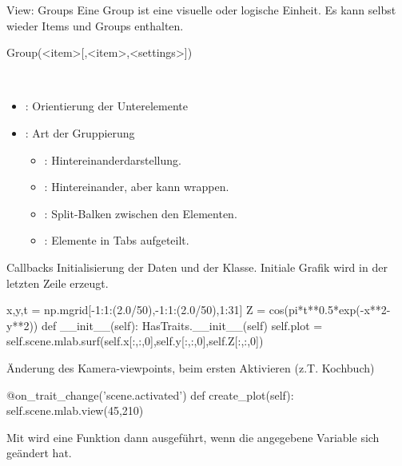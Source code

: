 \documentclass[hyperref={xetex}]{beamer}
\begin{document}
\begin{frame}[fragile]{View: Groups}
  Eine Group ist eine visuelle oder logische Einheit. Es kann selbst wieder Items und Groups enthalten.
  \begin{pyin}
Group(<item>[,<item>,<settings>])    
  \end{pyin}
\\
\begin{itemize}
  \item {}: Orientierung der Unterelemente\\
  \item {}:  Art der Gruppierung
\begin{itemize}
  \item {}: Hintereinanderdarstellung.\\
  \item {}: Hintereinander, aber kann wrappen.\\
  \item {}: Split-Balken zwischen den Elementen.\\
  \item {}: Elemente in Tabs aufgeteilt.
\end{itemize}
\end{itemize}
\end{frame}

\begin{frame}[fragile]{Callbacks}
Initialisierung der Daten und  der Klasse.
Initiale Grafik wird in der letzten Zeile erzeugt.  
  \begin{pyin}
   x,y,t = np.mgrid[-1:1:(2.0/50),-1:1:(2.0/50),1:31] 
   Z = cos(pi*t**0.5*exp(-x**2-y**2))
   def __init__(self):
        HasTraits.__init__(self)
        self.plot = self.scene.mlab.surf(self.x[:,:,0],self.y[:,:,0],self.Z[:,:,0])    
  \end{pyin}

Änderung des Kamera-viewpoints, beim ersten Aktivieren (z.T. Kochbuch)
\begin{pyin}
   @on_trait_change('scene.activated')
   def create_plot(self):
        self.scene.mlab.view(45,210)
\end{pyin}
Mit  wird eine Funktion dann ausgeführt, wenn die angegebene Variable sich geändert hat.
\end{frame}
\end{document}
